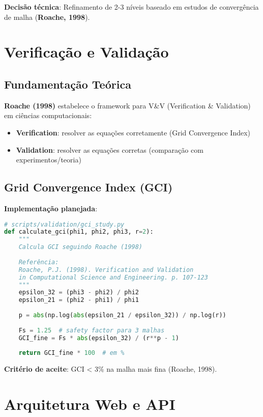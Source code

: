 \documentclass[12pt,a4paper]{article}
\begin{document}
\textbf{Decisão técnica}: Refinamento de 2-3 níveis baseado em estudos de convergência de malha (\textbf{Roache, 1998}).

\section{Verificação e Validação}

\subsection{Fundamentação Teórica}

\textbf{Roache (1998)} estabelece o framework para V\&V (Verification \& Validation) em ciências computacionais:

\begin{itemize}
    \item \textbf{Verification}: resolver as equações corretamente (Grid Convergence Index)
    \item \textbf{Validation}: resolver as equações corretas (comparação com experimentos/teoria)
\end{itemize}

\subsection{Grid Convergence Index (GCI)}

\textbf{Implementação planejada}:
\begin{lstlisting}[language=Python, caption=Cálculo do GCI]
# scripts/validation/gci_study.py
def calculate_gci(phi1, phi2, phi3, r=2):
    """
    Calcula GCI seguindo Roache (1998)
    
    Referência:
    Roache, P.J. (1998). Verification and Validation 
    in Computational Science and Engineering. p. 107-123
    """
    epsilon_32 = (phi3 - phi2) / phi2
    epsilon_21 = (phi2 - phi1) / phi1
    
    p = abs(np.log(abs(epsilon_21 / epsilon_32)) / np.log(r))
    
    Fs = 1.25  # safety factor para 3 malhas
    GCI_fine = Fs * abs(epsilon_32) / (r**p - 1)
    
    return GCI_fine * 100  # em %
\end{lstlisting}

\textbf{Critério de aceite}: GCI < 3\% na malha mais fina (Roache, 1998).

\section{Arquitetura Web e API}
\end{document}

